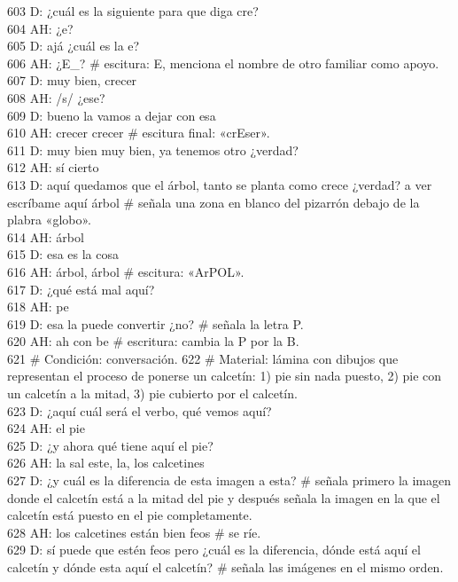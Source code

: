 603 D: ¿cuál es la siguiente para que diga cre?\\
604 AH: ¿e?\\
605 D: ajá ¿cuál es la e?\\
606 AH: ¿E\_? \# escitura: E, menciona el nombre de otro familiar como apoyo.\\
607 D: muy bien, crecer\\
608 AH: /s/ ¿ese?\\
609 D: bueno la vamos a dejar con esa\\
610 AH: crecer crecer \# escitura final: «crEser».\\
611 D: muy bien muy bien, ya tenemos otro ¿verdad?\\
612 AH: sí cierto\\
613 D: aquí quedamos que el árbol, tanto se planta como crece ¿verdad? a ver escríbame aquí árbol \# señala una zona en blanco del pizarrón debajo de la plabra «globo».\\
614 AH: árbol\\
615 D: esa es la cosa\\
616 AH: árbol, árbol \# escitura: «ArPOL».\\
617 D: ¿qué está mal aquí?\\
618 AH: pe\\
619 D: esa la puede convertir ¿no? \# señala la letra P.\\
620 AH: ah con be \# escritura: cambia la P por la B.\\
621 \# Condición: conversación.
622 \# Material: lámina con dibujos que representan el proceso de ponerse un calcetín: 1) pie sin nada puesto, 2) pie con un calcetín a la mitad, 3) pie cubierto por el calcetín.\\
623 D: ¿aquí cuál será el verbo, qué vemos aquí?\\
624 AH: el pie\\
625 D: ¿y ahora qué tiene aquí el pie?\\
626 AH: la sal este, la, los calcetines\\
627 D: ¿y cuál es la diferencia de esta imagen a esta? \# señala primero la imagen donde el calcetín está a la mitad del pie y después señala la imagen en la que el calcetín está puesto en el pie completamente.\\
628 AH: los calcetines están bien feos \# se ríe.\\
629 D: sí puede que estén feos pero ¿cuál es la diferencia, dónde está aquí el calcetín y dónde esta aquí el calcetín? \# señala las imágenes en el mismo orden.\\
